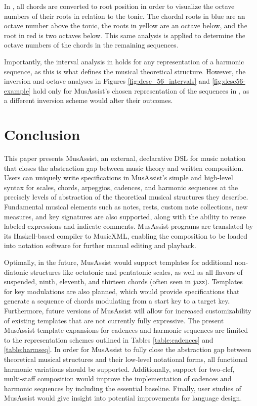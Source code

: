 \documentclass{article}
\begin{document}
In , all chords are converted to root position in order to visualize the octave numbers of their roots in relation to the tonic. The chordal roots in blue are an octave number above the tonic, the roots in yellow are an octave below, and the root in red is two octaves below. This same analysis is applied to determine the octave numbers of the chords in the remaining sequences.

Importantly, the interval analysis in  holds for any representation of a harmonic sequence, as this is what defines the musical theoretical structure. However, the inversion and octave analyses in Figures \ref{fig:desc_56_intervals} and \ref{fig:desc56-example} hold only for MusAssist’s chosen representation of the sequences in , as a different inversion scheme would alter their outcomes.

\section{Conclusion}
This paper presents MusAssist, an external, declarative DSL for music notation that closes the abstraction gap between music theory and written composition. Users can uniquely write specifications in MusAssist’s simple and high-level syntax for scales, chords, arpeggios, cadences, and harmonic sequences at the precisely levels of abstraction of the theoretical musical structures they describe. Fundamental musical elements such as notes, rests, custom note collections, new measures, and key signatures are also supported, along with the ability to reuse labeled expressions and indicate comments. MusAssist programs are translated by its Haskell-based compiler to MusicXML, enabling the composition to be loaded into notation software for further manual editing and playback.


Optimally, in the future, MusAssist would support templates for additional non-diatonic structures like octatonic and pentatonic scales, as well as all flavors of suspended, ninth, eleventh, and thirteen chords (often seen in jazz). Templates for key modulations are also planned, which would provide specifications that generate a sequence of chords modulating from a start key to a target key. Furthermore, future versions of MusAssist will allow for increased customizability of existing templates that are not currently fully expressive. The present MusAssist template expansions for cadences and harmonic sequences are limited to the representation schemes outlined in Tables \ref{table:cadences} and \ref{table:harmseq}. In order for MusAssist to fully close the abstraction gap between theoretical musical structures and their low-level notational forms, all functional harmonic variations should be supported. Additionally, support for two-clef, multi-staff composition would improve the implementation of cadences and harmonic sequences by including the essential baseline. Finally, user studies of MusAssist would give insight into potential improvements for language design.
\end{document}
